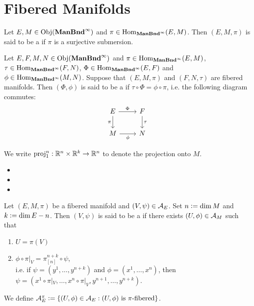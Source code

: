 \documentclass{book}
\begin{document}
\section{Fibered Manifolds}

\begin{defn} 
	Let $E, M \in \operatorname{Obj}(\operatorname*{\text{\textbf{ManBnd}}^{\infty}})$ and $\pi \in \operatorname{Hom}_{\operatorname*{\text{\textbf{ManBnd}}^{\infty}}}(E, M)$. Then $(E, M, \pi)$ is said to be a  if $\pi$ is a surjective submersion. 
\end{defn}

\begin{defn}
	Let $E,F, M, N \in \operatorname{Obj}(\operatorname*{\text{\textbf{ManBnd}}^{\infty}})$ and $\pi \in \operatorname{Hom}_{\operatorname*{\text{\textbf{ManBnd}}^{\infty}}}(E, M)$, $\tau \in \operatorname{Hom}_{\operatorname*{\text{\textbf{ManBnd}}^{\infty}}}(F, N)$, $\Phi \in \operatorname{Hom}_{\operatorname*{\text{\textbf{ManBnd}}^{\infty}}}(E, F)$ and $\phi \in \operatorname{Hom}_{\operatorname*{\text{\textbf{ManBnd}}^{\infty}}}(M, N)$. Suppose that $(E, M, \pi)$ and $(F, N, \tau)$ are fibered manifolds. Then $(\Phi, \phi)$ is said to be a  if $\tau \circ \Phi = \phi \circ \pi$, i.e. the following diagram commutes: \\
	\[ 
	\begin{tikzcd}
		E \arrow[d, "\pi"'] \arrow[r, "\Phi"] & F \arrow[d, "\tau"] \\
		M \arrow[r, "\phi"'] &  N
	\end{tikzcd}
	\] 
\end{defn}

\begin{note}
	We write $\operatorname{\text{proj}}^n_1: \mathbb{R}^n \times \mathbb{R}^k \rightarrow \mathbb{R}^n$ to denote the projection onto $M$.
\end{note}

\begin{itemize}
	\item {}
	\item {}
	\item {}
\end{itemize}

\begin{defn} 
	Let $(E, M, \pi)$ be a fibered manifold and $(V, \psi) \in \mathcal{A}_{E}$. Set $n \vcentcolon= \dim M$ and $k \vcentcolon= \dim E - n$. Then $(V, \psi)$ is said to be a  if there exists $(U, \phi) \in \mathcal{A}_{M}$ such that 
	\begin{enumerate}
		\item $U = \pi(V)$
		\item $\phi \circ \pi|_V = \pi^{n+k}_{[n]} \circ \psi$, \\
		i.e. if $\psi = (y^1, \ldots, y^{n+k})$ and $\phi = (x^1, \ldots, x^n)$, then $\psi = (x^1 \circ \pi|_V, \ldots, x^n \circ \pi|_V, y^{n+1}, \ldots, y^{n+k})$.
	\end{enumerate}
	We define $\mathcal{A}_E^{\pi} \vcentcolon= \{(U, \phi) \in \mathcal{A}_E: \text{$(U, \phi)$ is $\pi$-fibered} \}$.
\end{defn}
\end{document}
